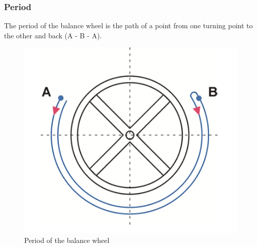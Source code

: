 \documentclass[12pt, a4paper]{report}
\begin{document}
\subsubsection{Period}
The period of the balance wheel is the path of a point from one turning point to the other and back (A - B - A). \cite{Witschi_basics}
    \begin{figure}[H]
    \centering
    \includegraphics[scale=0.4]{Images/period.png}
    
    \caption{Period of the balance wheel \cite{Witschi_basics}}
    \end{figure}
\bigskip
\end{document}
